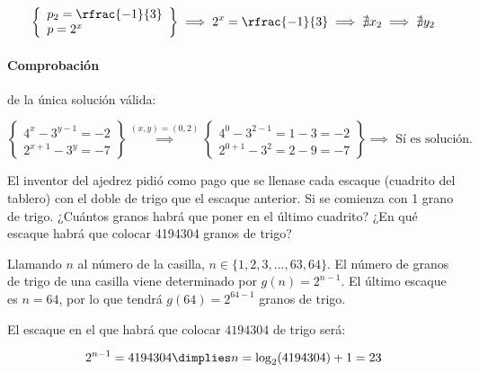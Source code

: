 \documentclass[palatino,nosec,nochap,nobuilddate]{Docencia}
\begin{document}
\begin{problem}
\[
	\left\{
			\begin{array}{l}
				p_2 = \rfrac{-1}{3}\\
				p = 2^x
			\end{array}
	\right\} \implies 2^x = \rfrac{-1}{3} \implies \nexists x_2 \implies \nexists y_2 
\]

\paragraph{Comprobación} de la única solución válida:

\[
	\left\{
		\begin{array}{l}
			4^x-3^{y-1}=-2\\
			2^{x+1}-3^y=-7
		\end{array}
	\right\} \overset{(x,y)=(0,2)}{\implies} 
	\left\{
		\begin{array}{l}
			4^0-3^{2-1}= 1-3 = -2\\
			2^{0+1}-3^2= 2-9 = -7 
		\end{array}
	\right\} \implies\text{ Sí es solución.}
\]

\end{problem}

\begin{problem}
El inventor del ajedrez pidió como pago que se llenase cada escaque (cuadrito del tablero) con el doble de trigo que el escaque anterior. Si se comienza con 1 grano de trigo. ¿Cuántos granos habrá que poner en el último cuadrito? ¿En qué escaque habrá que colocar 4194304 granos de trigo?
\solution

Llamando $n$ al número de la casilla, $n\in\{1,2,3,...,63,64\}$.
%
El número de granos de trigo de una casilla viene determinado por $g(n) = 2^{n-1}$.
%
El último escaque es $n=64$, por lo que tendrá $g(64) = 2^{64-1}$ granos de trigo.

El escaque en el que habrá que colocar $4194304$ de trigo será: 

\[
	2^{n-1} = 4194304 \dimplies n=\log_2 (4194304) + 1 = 23
\]

\end{problem}
\end{document}
